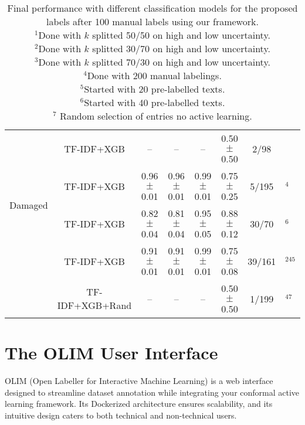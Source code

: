 \documentclass{article}
\begin{document}
\begin{table}[h]
\begin{tabular}{lccccccl}
\multirow{4}{*}{Damaged}      & TF-IDF+XGB & -- & -- & -- & 0.50 $\pm$ 0.50 & 2/98   &          \\ \cline{2-8} 
                             & TF-IDF+XGB & 0.96 $\pm$ 0.01 & 0.96 $\pm$ 0.01 & 0.99 $\pm$ 0.01 & 0.75 $\pm$ 0.25 & 5/195  &  $^{4}$        \\ \cline{2-8} 
                             & TF-IDF+XGB & 0.82 $\pm$ 0.04 & 0.81 $\pm$ 0.04 & 0.95 $\pm$ 0.05 & 0.88 $\pm$ 0.12 & 30/70  &  $^{6}$        \\ \cline{2-8} 
                             & TF-IDF+XGB & 0.91 $\pm$ 0.01 & 0.91 $\pm$ 0.01 & 0.99 $\pm$ 0.01 & 0.75 $\pm$ 0.08 & 39/161 &  $^{245}$        \\ \cline{2-8} 
                             & TF-IDF+XGB+Rand & -- & -- & -- & 0.50 $\pm$ 0.50 & 1/199  & $^{47}$         \\  \hline 
\end{tabular}
\caption{Final performance with different classification models for the proposed labels after 100 manual labels using our framework. \\ {\small $^1$Done with $k$ splitted 50/50 on high and low uncertainty. \\ $^2$Done with $k$ splitted 30/70 on high and low uncertainty. \\ $^3$Done with $k$ splitted 70/30 on high and low uncertainty. \\ $^4$Done with 200 manual labelings. \\ $^5$Started with 20 pre-labelled texts.\\ $^6$Started with 40 pre-labelled texts.\\ $^7$ Random selection of entries no active learning.}}
\label{tab:comp}
\end{table}
\egroup

\newpage
\section{The OLIM User Interface}

OLIM (Open Labeller for Interactive Machine Learning) is a web interface designed to streamline dataset annotation while integrating  your conformal active learning framework. Its Dockerized architecture ensures scalability, and its intuitive design caters to both technical and non-technical users.
\end{document}
